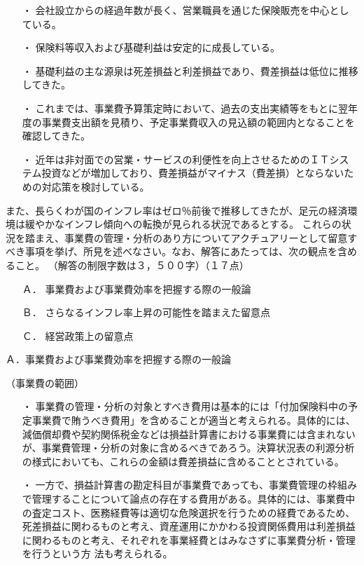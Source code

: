\documentclass[report,gutter=10mm,fore-edge=10mm,uplatex,dvipdfmx]{jlreq}
\begin{document}
\begin{itemize}
 \item [ ・] 会社設立からの経過年数が長く、営業職員を通じた保険販売を中心としている。
 \item [ ・] 保険料等収入および基礎利益は安定的に成長している。
 \item [ ・] 基礎利益の主な源泉は死差損益と利差損益であり、費差損益は低位に推移してきた。
 \item [ ・] これまでは、事業費予算策定時において、過去の支出実績等をもとに翌年度の事業費支出額を見積り、予定事業費収入の見込額の範囲内となることを確認してきた。
 \item [ ・] 近年は非対面での営業・サービスの利便性を向上させるためのＩＴシステム投資などが増加しており、費差損益がマイナス（費差損）とならないための対応策を検討している。
\end{itemize}

また、長らくわが国のインフレ率はゼロ％前後で推移してきたが、足元の経済環境は緩やかなインフレ傾向への転換が見られる状況であるとする。
これらの状況を踏まえ、事業費の管理・分析のあり方についてアクチュアリーとして留意すべき事項を挙げ、所見を述べなさい。なお、解答にあたっては、次の観点を含めること。
（解答の制限字数は３，５００字）（１７点）

\begin{itemize}
 \item [ Ａ．] 事業費および事業費効率を把握する際の一般論
 \item [ Ｂ．] さらなるインフレ率上昇の可能性を踏まえた留意点
 \item [ Ｃ．] 経営政策上の留意点
\end{itemize}

\answer{}

Ａ．事業費および事業費効率を把握する際の一般論

（事業費の範囲）

\begin{itemize}
 \item [ ・]  事業費の管理・分析の対象とすべき費用は基本的には「付加保険料中の予定事業費で賄うべき費用」を含めることが適当と考えられる。具体的には、減価償却費や契約関係税金などは損益計算書における事業費には含まれないが、事業費管理・分析の対象に含めるべきであろう。決算状況表の利源分析の様式においても、これらの金額は費差損益に含めることとされている。
 \item [ ・]  一方で、損益計算書の勘定科目が事業費であっても、事業費管理の枠組みで管理することについて論点の存在する費用がある。具体的には、事業費中の査定コスト、医務経費等は適切な危険選択を行うための経費であるため、死差損益に関わるものと考え、資産運用にかかわる投資関係費用は利差損益に関わるものと考え、それぞれを事業経費とはみなさずに事業費分析・管理を行うという方
 法も考えられる。
\end{itemize}
\end{document}

